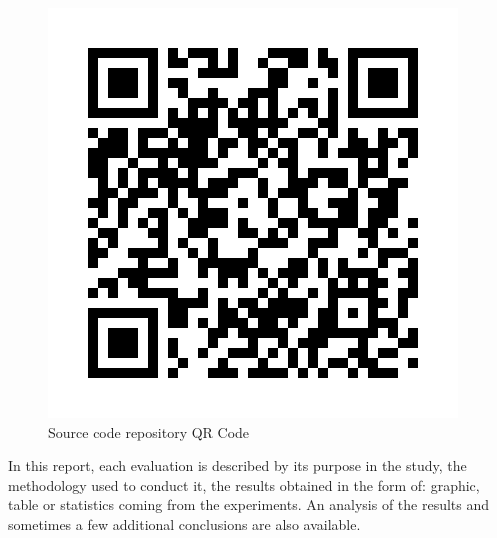 \begin{figure}
  \centering
  \caption[Source code repository, QR Code]{Source code repository QR Code}
  \label{fig:qr_code_repository}
  \includegraphics[width=0.8\linewidth]{img/qr_code_repository.png}
\end{figure}

In this report, each evaluation is described by its purpose in the study, the methodology used to conduct it, the results obtained in the form of: graphic, table or statistics coming from the experiments.
An analysis of the results and sometimes a few additional conclusions are also available.
